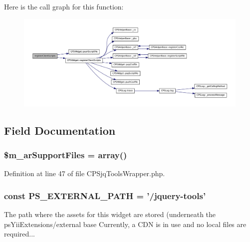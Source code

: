 Here is the call graph for this function:\nopagebreak
\begin{figure}[H]
\begin{center}
\leavevmode
\includegraphics[width=400pt]{classCPSjqToolsWrapper_ac02a66bde8e72e4909137bf748edf665_cgraph}
\end{center}
\end{figure}




\subsection{Field Documentation}
\hypertarget{classCPSjqToolsWrapper_a9c534841f3f306a177d9be4a425c9e04}{
\subsubsection[{\$m\_\-arSupportFiles}]{\setlength{\rightskip}{0pt plus 5cm}\$m\_\-arSupportFiles = {\bf array}()}}
\label{classCPSjqToolsWrapper_a9c534841f3f306a177d9be4a425c9e04}


Definition at line 47 of file CPSjqToolsWrapper.php.

\hypertarget{classCPSjqToolsWrapper_a8ccb5e1d65c091f944a6aa8c5be834ca}{
\subsubsection[{PS\_\-EXTERNAL\_\-PATH}]{\setlength{\rightskip}{0pt plus 5cm}const {\bf PS\_\-EXTERNAL\_\-PATH} = '/jquery-\/tools'}}
\label{classCPSjqToolsWrapper_a8ccb5e1d65c091f944a6aa8c5be834ca}
The path where the assets for this widget are stored (underneath the psYiiExtensions/external base Currently, a CDN is in use and no local files are required... 

